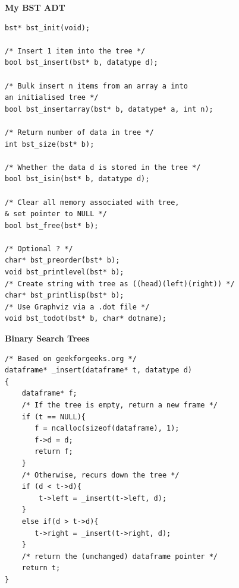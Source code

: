 \newpage	
{\samepage	
\begin{center}	
{\Large{\bf My BST ADT}}	
\end{center}	
{\small	
\begin{verbatim}	
bst* bst_init(void);	

/* Insert 1 item into the tree */	
bool bst_insert(bst* b, datatype d);	

/* Bulk insert n items from an array a into
an initialised tree */	
bool bst_insertarray(bst* b, datatype* a, int n);	

/* Return number of data in tree */	
int bst_size(bst* b);	

/* Whether the data d is stored in the tree */	
bool bst_isin(bst* b, datatype d);	

/* Clear all memory associated with tree,
& set pointer to NULL */	
bool bst_free(bst* b);	

/* Optional ? */	
char* bst_preorder(bst* b);	
void bst_printlevel(bst* b);	
/* Create string with tree as ((head)(left)(right)) */	
char* bst_printlisp(bst* b);	
/* Use Graphviz via a .dot file */	
void bst_todot(bst* b, char* dotname);	
\end{verbatim}	
}}	

\newpage	
{\samepage	
\begin{center}	
{\Large{\bf Binary Search Trees}}	
\end{center}	
{\small
\begin{verbatim}	
/* Based on geekforgeeks.org */	
dataframe* _insert(dataframe* t, datatype d)	
{	
    dataframe* f;	
    /* If the tree is empty, return a new frame */	
    if (t == NULL){	
       f = ncalloc(sizeof(dataframe), 1);	
       f->d = d;	
       return f;	
    }	
    /* Otherwise, recurs down the tree */	
    if (d < t->d){	
        t->left = _insert(t->left, d);	
    }	
    else if(d > t->d){	
       t->right = _insert(t->right, d);	
    }	
    /* return the (unchanged) dataframe pointer */	
    return t;	
}	
\end{verbatim}	
}}

